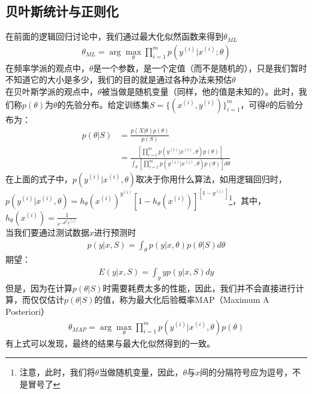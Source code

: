 \subsection{贝叶斯统计与正则化}
在前面的逻辑回归讨论中，我们通过最大化似然函数来得到$\theta_{ML}$
\begin{align}
	\theta_{ML} = \arg \max_{\theta} \prod_{i=1}^{m}p(y^{(i)}|x^{(i)}; \theta)
\end{align}
在频率学派的观点中，$\theta$是一个参数，是一个定值（而不是随机的），只是我们暂时不知道它的大小是多少，我们的目的就是通过各种办法来预估$\theta$ \\
在贝叶斯学派的观点中，$\theta$被当做是随机变量（同样，他的值是未知的）。此时，我们称$p(\theta)$为$\theta$的先验分布。给定训练集$S=\{(x^{(i)}, y^{(i)})\}_{i=1}^{m}$，可得$\theta$的后验分布为：
\begin{align}
	p(\theta | S) &= \frac{p(X|\theta)p(\theta)}{p(S)} \\
	&= \frac{\left[\prod_{i=1}^{m}p(y^{(i)}|x^{(i)}, \theta) p(\theta)\right]}{\int_{\theta}\left[\prod_{i=1}^{m}p(y^{(i)}|x^{(i)}, \theta) p(\theta)\right]d\theta}
\end{align}
在上面的式子中，$p(y^{(i)}|x^{(i)}, \theta)$取决于你用什么算法，如用逻辑回归时，$p(y^{(i)}|x^{(i)}, \theta)=h_{\theta}(x^{(i)})^{y^{(i)}}\left[1-h_{\theta}(x^{(i)})\right]^{\left[1-y^{(i)}\right]}$\footnote{注意，此时，我们将$\theta$当做随机变量，因此，$\theta$与$x$间的分隔符号应为逗号，不是冒号了}，其中，$h_{\theta}(x^{(i)})=\frac{1}{e^{-\theta^Tx^{(i)}}}$ \\
当我们要通过测试数据$x$进行预测时
\begin{align}
	p(y|x, S) = \int_{\theta}p(y|x, \theta)p(\theta|S)d\theta
\end{align}
期望：
\begin{align}
	E(y|x, S) = \int_{y}yp(y|x, S)dy
\end{align}
但是，因为在计算$p(\theta | S)$时需要耗费太多的性能，因此，我们并不会直接进行计算，而仅仅估计$p(\theta | S)$的值，称为最大化后验概率MAP（Maximum A Posteriori）
\begin{align}
	\theta_{MAP} = \arg \max_{\theta} \prod_{i=1}^{m}p(y^{(i)}|x^{(i)}, \theta)p(\theta)
\end{align}
有上式可以发现，最终的结果与最大化似然得到的一致。\\


























































